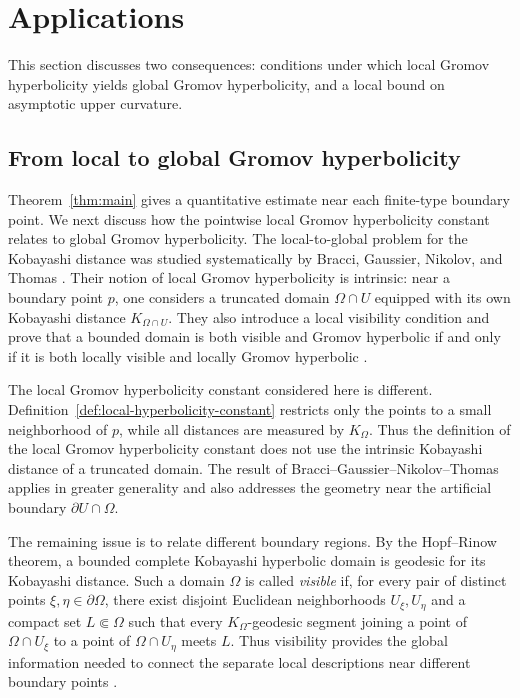 \documentclass[11pt]{article}
\theoremstyle{definition}
\begin{document}
\section{Applications}
\label{sec:applications}

This section discusses two consequences:
conditions under which local Gromov hyperbolicity yields global
Gromov hyperbolicity, and a local bound on asymptotic upper curvature.

\subsection{From local to global Gromov hyperbolicity}
Theorem~\ref{thm:main} gives a quantitative estimate near each
finite-type boundary point.  We next discuss how the pointwise local Gromov hyperbolicity
constant relates to global Gromov hyperbolicity.
The local-to-global problem for the Kobayashi distance was studied
systematically by Bracci, Gaussier, Nikolov, and Thomas
\cite{BracciGaussierNikolovThomas}.  Their notion of local Gromov
hyperbolicity is intrinsic: near a boundary point \(p\), one considers a
truncated domain \(\Omega\cap U\) equipped with its own Kobayashi distance
\(K_{\Omega\cap U}\).  They also introduce a local visibility condition and
prove that a bounded domain is both visible and Gromov hyperbolic
if and only if it is both locally visible and locally Gromov hyperbolic
\cite[Theorem~1.2]{BracciGaussierNikolovThomas}.

The local Gromov hyperbolicity constant considered here is different.
Definition~\ref{def:local-hyperbolicity-constant} restricts only the
points to a small neighborhood of \(p\), while all distances are
measured by \(K_\Omega\).  Thus the definition of the local Gromov hyperbolicity constant does not use
the intrinsic Kobayashi distance of a truncated domain.
The result of Bracci--Gaussier--Nikolov--Thomas applies in greater
generality and also addresses the geometry near the artificial
boundary \(\partial U\cap\Omega\).

The remaining issue is to relate different boundary regions.  By the
Hopf--Rinow theorem, a bounded complete Kobayashi hyperbolic domain is
geodesic for its Kobayashi distance.  Such a domain \(\Omega\) is called
\emph{visible} if, for every pair of distinct points
\(\xi,\eta\in\partial\Omega\), there exist disjoint Euclidean neighborhoods
\(U_\xi,U_\eta\) and a compact set \(L\Subset\Omega\) such that every
\(K_\Omega\)-geodesic segment joining a point of
\(\Omega\cap U_\xi\) to a point of \(\Omega\cap U_\eta\) meets \(L\).
Thus visibility provides the global information needed to connect the
separate local descriptions near different boundary points
\cite{BracciGaussierNikolovThomas}.
\end{document}
